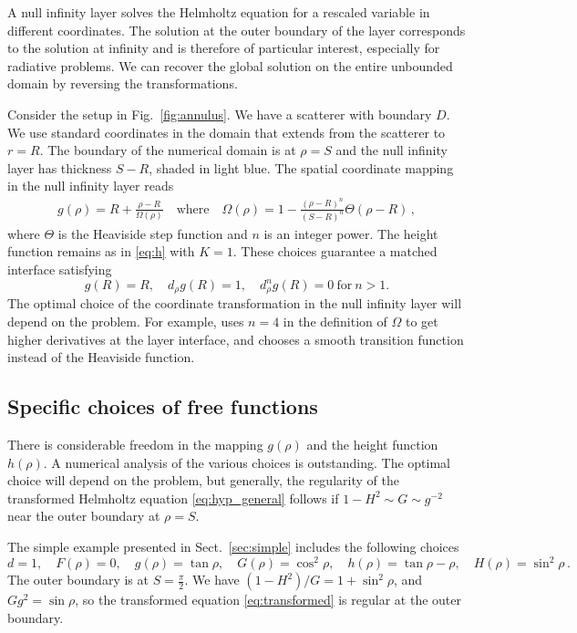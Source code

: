 \documentclass[draft,onefignum,onetabnum]{siamart190516}
\begin{document}
A null infinity layer solves the Helmholtz equation for a rescaled variable in different coordinates. The solution at the outer boundary of the layer corresponds to the solution at infinity and is therefore of particular interest, especially for radiative problems. We can recover the global solution on the entire unbounded domain by reversing the transformations. 

Consider the setup in Fig.~\ref{fig:annulus}. We have a scatterer with boundary $D$. We use standard coordinates in the domain that extends from the scatterer to $r=R$. The boundary of the numerical domain is at $\rho=S$ and the null infinity layer has thickness $S-R$, shaded in light blue. The spatial coordinate mapping in the null infinity layer reads
\begin{align}\label{eq:layer}
g(\rho)=R+ \frac{\rho-R}{\Omega(\rho)} \quad \mathrm{where} \quad \Omega(\rho) = 1 - \frac{(\rho-R)^n}{(S-R)^n}\Theta(\rho-R)\,,
\end{align}
where $\Theta$ is the Heaviside step function and $n$ is an integer power. The height function remains as in \eqref{eq:h} with $K=1$. These choices guarantee a matched interface satisfying
\[ g(R) = R, \quad d_\rho g(R) = 1, \quad d_\rho^n g(R) = 0 \ \mathrm{for} \ n>1. \] 
The optimal choice of the coordinate transformation in the null infinity layer will depend on the problem. For example, \cite{bernuzzi2011binary} uses $n=4$ in the definition of $\Omega$ to get higher derivatives at the layer interface, and \cite{hilditch2018evolution} chooses a smooth transition function instead of the Heaviside function.


\subsection{Specific choices of free functions}
There is considerable freedom in the mapping $g(\rho)$ and the height function $h(\rho)$. A numerical analysis of the various choices is outstanding. The optimal choice will depend on the problem, but generally, the regularity of the transformed Helmholtz equation \eqref{eq:hyp_general} follows if $1-H^2\sim G\sim g^{-2}$ near the outer boundary at $\rho=S$. 

The simple example presented in Sect.~\ref{sec:simple} includes the following choices
\[ d=1, \quad F(\rho)=0, \quad g(\rho)=\tan \rho, \quad G(\rho) = \cos^2\rho, \quad h(\rho) =\tan\rho - \rho, \quad H(\rho)= \sin^2\rho\,.\]
The outer boundary is at $S=\tfrac{\pi}{2}$. We have $(1-H^2)/G = 1+\sin^2\rho$, and $G g^2 = \sin\rho$, so the transformed equation \eqref{eq:transformed} is regular at the outer boundary. 
\end{document}
